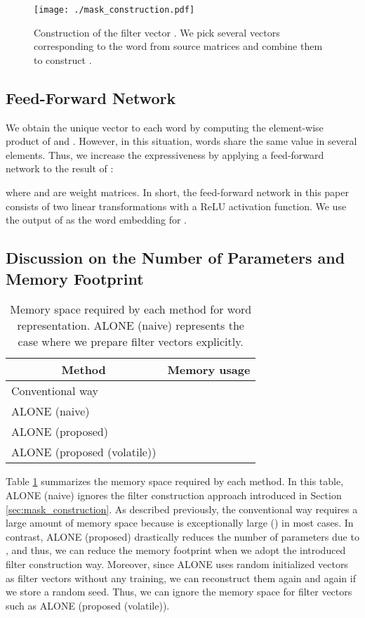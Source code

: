 \documentclass{article}
\begin{document}
\begin{figure}[!t]
  \centering
  \texttt{[image: ./mask\_construction.pdf]}
   \caption{Construction of the filter vector . We pick several vectors corresponding to the word  from source matrices and combine them to construct .}
   \label{fig:mask_construction}
\end{figure}


\subsection{Feed-Forward Network}
We obtain the unique vector to each word by computing the element-wise product of  and .
However, in this situation, words share the same value in several elements.
Thus, we increase the expressiveness by applying a feed-forward network  to the result of :

where  and  are weight matrices.
In short, the feed-forward network in this paper consists of two linear transformations with a ReLU activation function.
We use the output of  as the word embedding for .


\subsection{Discussion on the Number of Parameters and Memory Footprint}

\begin{table}[!t]
  \centering
  \caption{Memory space required by each method for word representation. ALONE (naive) represents the case where we prepare filter vectors explicitly.\label{tab:param_num}}
  \begin{tabular}{ l c } \hline
   \multicolumn{1}{c}{Method} & Memory usage \\ \hline
  Conventional way &  \\
  ALONE (naive)    &  \\
  ALONE (proposed) &  \\
  ALONE (proposed (volatile)) &  \\ \hline
  \end{tabular}
\end{table}

Table \ref{tab:param_num} summarizes the memory space required by each method.
In this table, ALONE (naive) ignores the filter construction approach introduced in Section \ref{sec:mask_construction}.
As described previously, the conventional way requires a large amount of memory space because  is exceptionally large () in most cases.
In contrast, ALONE (proposed) drastically reduces the number of parameters due to , and thus, we can reduce the memory footprint when we adopt the introduced filter construction way.
Moreover, since ALONE uses random initialized vectors as filter vectors without any training, we can reconstruct them again and again if we store a random seed.
Thus, we can ignore the memory space for filter vectors such as ALONE (proposed (volatile)).
\end{document}
